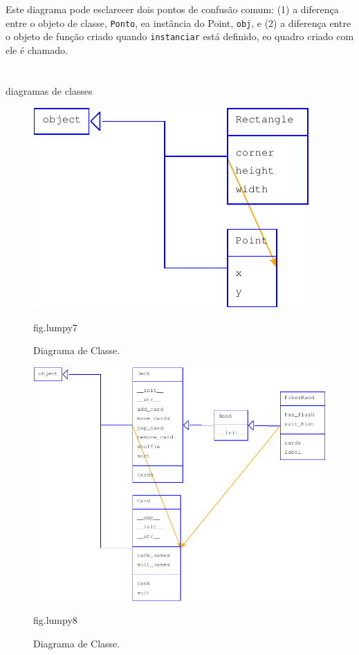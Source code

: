 \documentclass[10pt]{book}
\begin{document}
\begin{exercise}
\begin{v erbatim}
{Este diagrama pode esclarecer dois pontos de confusão comum: (1) a
diferença entre o objeto de classe, {\tt Ponto}, ea instância do
Point, {\tt obj}, e (2) a diferença entre o objeto de função
criado quando {\tt instanciar} está definido, eo quadro criado com
ele é chamado.


\section{} diagramas de classes

\begin{figure}
\centerline
{\includegraphics[scale = 0.7] {figs/lumpydemo7.pdf}}
\caption{Diagrama de Classe.}
\label{} fig.lumpy7
\end{figure}

\begin{figure}
\centerline
{\includegraphics[scale = 0.7] {figs/lumpydemo8.pdf}}
\caption{Diagrama de Classe.}
\label{} fig.lumpy8
\end{figure}

}
\end{v erbatim}
\end{exercise}
\end{document}
